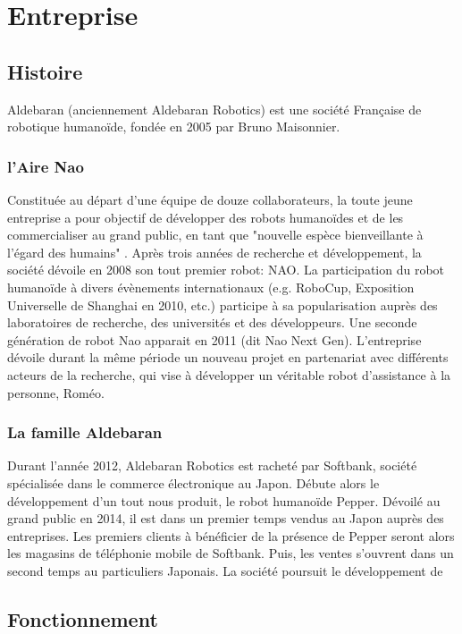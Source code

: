 \chapter*{Entreprise}
\label{Entreprise}
\thispagestyle{fancy}

\section{Histoire}
\label{Entreprise: histoire}
Aldebaran (anciennement Aldebaran Robotics) est une société Française de robotique humanoïde, fondée en 2005 par Bruno Maisonnier. 

\subsection{l'Aire Nao}
\label{Entreprise:Histoire:Nao}
Constituée au départ d'une équipe de douze collaborateurs, la toute jeune entreprise a pour objectif de développer des robots humanoïdes et de les commercialiser au grand public, en tant que "nouvelle espèce bienveillante à l'égard des humains" . Après trois années de recherche et développement, la société dévoile en 2008 son tout premier robot: NAO. La participation du robot humanoïde à divers évènements internationaux (e.g. RoboCup, Exposition Universelle de Shanghai en 2010, etc.) participe à sa popularisation auprès des laboratoires de recherche, des universités et des développeurs. Une seconde génération de robot Nao apparait en 2011 (dit Nao Next Gen). L'entreprise dévoile durant la même période un nouveau projet en partenariat avec différents acteurs de la recherche,  qui vise à développer un véritable robot d'assistance à la personne, Roméo. 

\subsection{La famille Aldebaran}
Durant l'année 2012, Aldebaran Robotics est racheté par Softbank, société spécialisée dans le commerce électronique au Japon. Débute alors le développement d'un tout nous produit, le robot humanoïde Pepper. Dévoilé au grand public en 2014, il est dans un premier temps vendus au Japon auprès des entreprises. Les premiers clients à bénéficier de la présence de Pepper seront alors les magasins de téléphonie mobile de Softbank. Puis, les ventes s'ouvrent dans un second temps au particuliers Japonais. La société poursuit le développement de 
\section{Fonctionnement}
